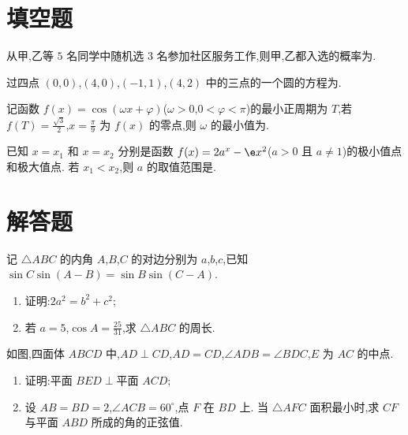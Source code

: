 \section{填空题}

\begin{problem}
从甲,乙等 \(5\) 名同学中随机选 \(3\) 名参加社区服务工作,则甲,乙都入选的概率为\fillinblank{}.
\end{problem}

\begin{problem}
过四点 \((0,0)\),\((4,0)\),\((-1,1)\),\((4,2)\) 中的三点的一个圆的方程为\fillinblank{}.
\end{problem}

\begin{problem}
记函数 \(f(x)=\cos \left( \omega x+\varphi \right)\)(\(\omega>0\),\(0<\varphi<\pi\))的最小正周期为 \(T\),若 \(f(T)=\frac{\sqrt{3}}{2}\),\(x=\frac{\pi}{9}\) 为 \(f(x)\) 的零点,则 \(\omega\) 的最小值为\fillinblank{}.
\end{problem}

\begin{problem}
已知 \(x=x_1\) 和 \(x=x_2\) 分别是函数 \(f(x)=2a^x-\e x^2\)(\(a>0\) 且 \(a\neq 1\))的极小值点和极大值点. 若 \(x_1<x_2\),则 \(a\) 的取值范围是\fillinblank{}.
\end{problem}

\section{解答题}

\begin{problem}
记 \(\triangle ABC\) 的内角 \(A\),\(B\),\(C\) 的对边分别为 \(a\),\(b\),\(c\),已知 \(\sin C\sin \left( A-B \right)=\sin B\sin \left( C-A \right)\).
\begin{enumerate}
\item 证明:\(2a^2=b^2+c^2\);
\item 若 \(a=5\),\(\cos A=\frac{25}{31}\),求 \(\triangle ABC\) 的周长.
\end{enumerate}
\end{problem}

\begin{problem}
如图,四面体 \(ABCD\) 中,\(AD\perp CD\),\(AD=CD\),\(\angle ADB=\angle BDC\),\(E\) 为 \(AC\) 的中点.

\begin{enumerate}
\item 证明:\(\text{平面 }BED\perp \text{平面 }ACD\);
\item 设 \(AB=BD=2\),\(\angle ACB=60^\circ\),点 \(F\) 在 \(BD\) 上. 当 \(\triangle AFC\) 面积最小时,求 \(CF\) 与平面 \(ABD\) 所成的角的正弦值.
\end{enumerate}

\end{problem}

